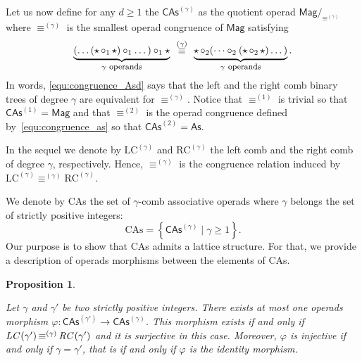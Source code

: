 \documentclass[10pt,reqno]{amsart}
\numberwithin{equation}{subsection}
\newtheorem{Proposition}[Theorem]{Proposition}
\renewcommand{\geq}{\geqslant}
\newcommand{\Mag}{\mathsf{Mag}}
\newcommand{\As}{\mathsf{As}}
\newcommand{\CAs}[1]{\mathsf{CAs}^{(#1)}}
\newcommand{\LC}[1]{\text{LC}^{(#1)}}
\newcommand{\RC}[1]{\text{RC}^{(#1)}}
\DeclareMathOperator{\Product}{\star}
\DeclareMathOperator{\Congr}{\equiv}
\newcommand{\CongrCAs}[1]{\Congr^{(#1)}}
\begin{document}
Let us now define for any $d \geq 1$ the  $\CAs{\gamma}$ as the quotient operad $\Mag/_{\CongrCAs{\gamma}}$ where
$\CongrCAs{\gamma}$ is the smallest operad congruence of $\Mag$
satisfying
\begin{equation} \label{equ:congruence_Asd}
    \underbrace{(\dots (\Product \circ_1 \Product) \circ_1 \dots)
        \circ_1 \Product}
    _{\gamma \mbox{ \footnotesize operands}}
    \enspace \CongrCAs{\gamma} \enspace
    \underbrace{\Product \circ_2
        (\dots \circ_2 (\Product \circ_2 \Product) \dots)}
    _{\gamma \mbox{ \footnotesize operands}}.
\end{equation}
In words, \eqref{equ:congruence_Asd} says that the left and the right
comb binary trees of degree $\gamma$ are equivalent for $\CongrCAs{\gamma}$.
Notice that $\CongrCAs{1}$ is trivial so that $\CAs{1} = \Mag$ and that
$\CongrCAs{2}$ is the operad congruence defined
by~\eqref{equ:congruence_as} so that $\CAs{2} = \As$.

In the sequel we denote by $\LC{\gamma}$ and $\RC{\gamma}$ the left comb and the
right comb of degree $\gamma$, respectively. Hence, $\CongrCAs{\gamma}$ is the
congruence relation induced by $\LC{\gamma}\CongrCAs{\gamma}\RC{\gamma}$.

We denote by CAs the set of $\gamma$-comb associative operads where $\gamma$ belongs
the set of strictly positive integers:
\[\text{CAs}=\left\{\CAs{\gamma}\mid\gamma\geq 1\right\}.\]
Our purpose is to show that CAs admits a lattice structure. For that, we provide
a description of operads morphisms between the elements of CAs.

\begin{Proposition}\label{prop:morphisms_CAs_d}
  
  Let $\gamma$ and $\gamma'$ be two strictly positive integers. There exists at most
  one operads morphism $\varphi:\CAs{\gamma'}\to\CAs{\gamma}$. This morphism
  exists if and only if $\emph{LC}\left(\gamma'\right)\CongrCAs{\gamma}\emph{RC}\left(\gamma'\right)$ and it is surjective in this
  case. Moreover, $\varphi$ is injective if and only if $\gamma=\gamma'$, that is if and only
  if $\varphi$ is the identity morphism.
  
  \end{Proposition}
\end{document}
